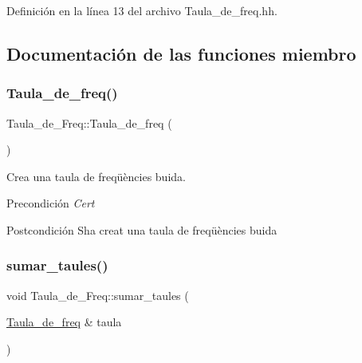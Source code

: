 Definición en la línea 13 del archivo Taula\+\_\+de\+\_\+freq.\+hh.



\subsection{Documentación de las funciones miembro}
\mbox{\label{class_taula__de___freq_a4d595845d73112d4b9f6597f418c5267}} 
\subsubsection{\texorpdfstring{Taula\+\_\+de\+\_\+freq()}{Taula\_de\_freq()}}
{\footnotesize\ttfamily Taula\+\_\+de\+\_\+\+Freq\+::\+Taula\+\_\+de\+\_\+freq (\begin{DoxyParamCaption}{ }\end{DoxyParamCaption})}



Crea una taula de freqüències buida. 

\begin{DoxyPrecond}{Precondición}
{\itshape Cert} 
\end{DoxyPrecond}
\begin{DoxyPostcond}{Postcondición}
S\textquotesingle{}ha creat una taula de freqüències buida 
\end{DoxyPostcond}
\mbox{\label{class_taula__de___freq_ace5e740c1cee29557fd7ad80618ccb8a}} 
\subsubsection{\texorpdfstring{sumar\+\_\+taules()}{sumar\_taules()}}
{\footnotesize\ttfamily void Taula\+\_\+de\+\_\+\+Freq\+::sumar\+\_\+taules (\begin{DoxyParamCaption}\item[{\hyperlink{class_taula__de__freq}{Taula\+\_\+de\+\_\+freq} \&}]{taula }\end{DoxyParamCaption})}



